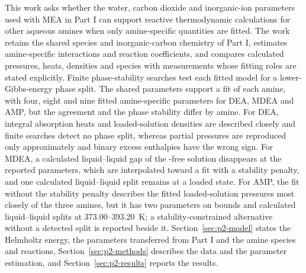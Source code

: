 This work asks whether the water, carbon dioxide and inorganic-ion parameters used with MEA in Part I can support reactive thermodynamic calculations for other aqueous amines when only amine-specific quantities are fitted.
The work retains the shared species and inorganic-carbon chemistry of Part I, estimates amine-specific interactions and reaction coefficients, and compares calculated pressures, heats, densities and species with measurements whose fitting roles are stated explicitly.
Finite phase-stability searches test each fitted model for a lower-Gibbs-energy phase split.
The shared parameters support a fit of each amine, with four, eight and nine fitted amine-specific parameters for DEA, MDEA and AMP, but the agreement and the phase stability differ by amine.
For DEA, integral absorption heats and loaded-solution densities are described closely and finite searches detect no phase split, whereas  partial pressures are reproduced only approximately and binary excess enthalpies have the wrong sign.
For MDEA, a calculated liquid--liquid gap of the \COtwo-free solution disappears at the reported parameters, which are interpolated toward a fit with a stability penalty, and one calculated liquid--liquid split remains at a loaded state.
For AMP, the fit without the stability penalty describes the fitted loaded-solution pressures most closely of the three amines, but it has two parameters on bounds and calculated liquid--liquid splits at 373.00--393.20~K; a stability-constrained alternative without a detected split is reported beside it.
Section~\ref{sec:p2-model} states the Helmholtz energy, the parameters transferred from Part I and the amine species and reactions, Section~\ref{sec:p2-methods} describes the data and the parameter estimation, and Section~\ref{sec:p2-results} reports the results.
